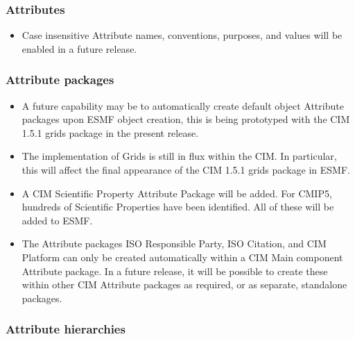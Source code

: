 %


\subsubsection{Attributes}

\begin{itemize}
\item Case insensitive Attribute names, conventions, purposes, and values will be enabled in a future release.
\end{itemize}


\subsubsection{Attribute packages}

\begin{itemize}
\item A future capability may be to automatically create default object Attribute packages upon ESMF object creation, this is being prototyped with the CIM 1.5.1 grids package in the present release.
\item The implementation of Grids is still in flux within the CIM.  In particular, this will affect the final appearance of the CIM 1.5.1 grids package in ESMF.
\item A CIM Scientific Property Attribute Package will be added. For CMIP5, hundreds of Scientific Properties have been identified. All of these will be added to ESMF. 
\item The Attribute packages ISO Responsible Party, ISO Citation, and CIM Platform can only be created automatically within a CIM Main component Attribute package.  In a future release, it will be possible to create these within other CIM Attribute packages as required, or as separate, standalone packages.
\end{itemize}


\subsubsection{Attribute hierarchies}

